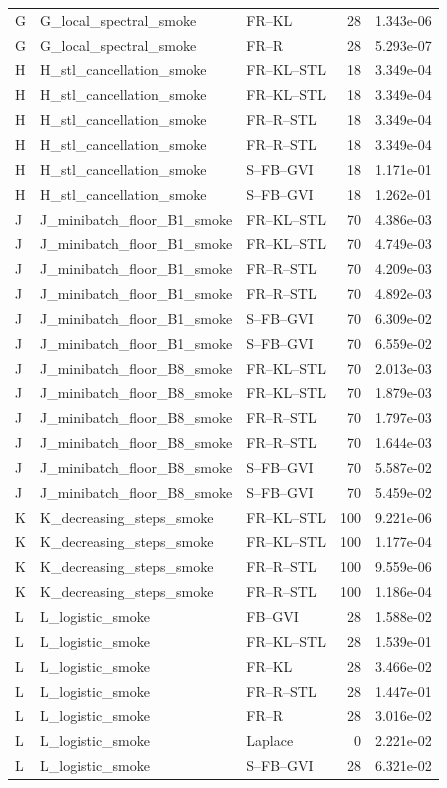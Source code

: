 \begin{tabular}{lllrr}
G & G_local_spectral_smoke & FR--KL & 28 & 1.343e-06 \\
G & G_local_spectral_smoke & FR--R & 28 & 5.293e-07 \\
H & H_stl_cancellation_smoke & FR--KL--STL & 18 & 3.349e-04 \\
H & H_stl_cancellation_smoke & FR--KL--STL & 18 & 3.349e-04 \\
H & H_stl_cancellation_smoke & FR--R--STL & 18 & 3.349e-04 \\
H & H_stl_cancellation_smoke & FR--R--STL & 18 & 3.349e-04 \\
H & H_stl_cancellation_smoke & S--FB--GVI & 18 & 1.171e-01 \\
H & H_stl_cancellation_smoke & S--FB--GVI & 18 & 1.262e-01 \\
J & J_minibatch_floor_B1_smoke & FR--KL--STL & 70 & 4.386e-03 \\
J & J_minibatch_floor_B1_smoke & FR--KL--STL & 70 & 4.749e-03 \\
J & J_minibatch_floor_B1_smoke & FR--R--STL & 70 & 4.209e-03 \\
J & J_minibatch_floor_B1_smoke & FR--R--STL & 70 & 4.892e-03 \\
J & J_minibatch_floor_B1_smoke & S--FB--GVI & 70 & 6.309e-02 \\
J & J_minibatch_floor_B1_smoke & S--FB--GVI & 70 & 6.559e-02 \\
J & J_minibatch_floor_B8_smoke & FR--KL--STL & 70 & 2.013e-03 \\
J & J_minibatch_floor_B8_smoke & FR--KL--STL & 70 & 1.879e-03 \\
J & J_minibatch_floor_B8_smoke & FR--R--STL & 70 & 1.797e-03 \\
J & J_minibatch_floor_B8_smoke & FR--R--STL & 70 & 1.644e-03 \\
J & J_minibatch_floor_B8_smoke & S--FB--GVI & 70 & 5.587e-02 \\
J & J_minibatch_floor_B8_smoke & S--FB--GVI & 70 & 5.459e-02 \\
K & K_decreasing_steps_smoke & FR--KL--STL & 100 & 9.221e-06 \\
K & K_decreasing_steps_smoke & FR--KL--STL & 100 & 1.177e-04 \\
K & K_decreasing_steps_smoke & FR--R--STL & 100 & 9.559e-06 \\
K & K_decreasing_steps_smoke & FR--R--STL & 100 & 1.186e-04 \\
L & L_logistic_smoke & FB--GVI & 28 & 1.588e-02 \\
L & L_logistic_smoke & FR--KL--STL & 28 & 1.539e-01 \\
L & L_logistic_smoke & FR--KL & 28 & 3.466e-02 \\
L & L_logistic_smoke & FR--R--STL & 28 & 1.447e-01 \\
L & L_logistic_smoke & FR--R & 28 & 3.016e-02 \\
L & L_logistic_smoke & Laplace & 0 & 2.221e-02 \\
L & L_logistic_smoke & S--FB--GVI & 28 & 6.321e-02 \\
\bottomrule
\end{tabular}
